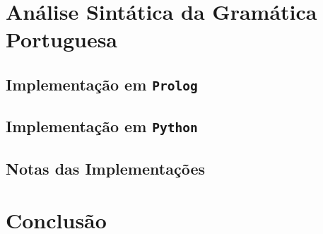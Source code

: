 \documentclass[12pt,a4paper,oneside]{article}
\begin{document}
\section{Análise Sintática da Gramática Portuguesa}
\label{sec:imp}

\lipsum[1]

\subsection{Implementação em \texttt{Prolog}}

\lipsum[1]

\lipsum[2]

\lipsum[3]

\subsection{Implementação em \texttt{Python}}

\lipsum[1]

\lipsum[2]

\lipsum[3]

\subsection{Notas das Implementações}

\lipsum[1]

\lipsum[2]


\section{Conclusão}
\label{sec:conc}

\lipsum[1]

\lipsum[2]



\end{document}
